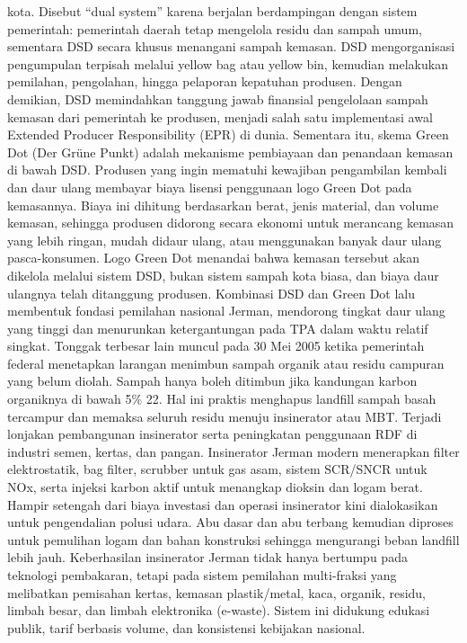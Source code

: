 \documentclass[
  letterpaper,
  DIV=11,
  numbers=noendperiod]{scrreprt}
\begin{document}
kota. Disebut ``dual system'' karena berjalan berdampingan dengan sistem
pemerintah: pemerintah daerah tetap mengelola residu dan sampah umum,
sementara DSD secara khusus menangani sampah kemasan. DSD mengorganisasi
pengumpulan terpisah melalui yellow bag atau yellow bin, kemudian
melakukan pemilahan, pengolahan, hingga pelaporan kepatuhan produsen.
Dengan demikian, DSD memindahkan tanggung jawab finansial pengelolaan
sampah kemasan dari pemerintah ke produsen, menjadi salah satu
implementasi awal Extended Producer Responsibility (EPR) di dunia.
Sementara itu, skema Green Dot (Der Grüne Punkt) adalah mekanisme
pembiayaan dan penandaan kemasan di bawah DSD. Produsen yang ingin
mematuhi kewajiban pengambilan kembali dan daur ulang membayar biaya
lisensi penggunaan logo Green Dot pada kemasannya. Biaya ini dihitung
berdasarkan berat, jenis material, dan volume kemasan, sehingga produsen
didorong secara ekonomi untuk merancang kemasan yang lebih ringan, mudah
didaur ulang, atau menggunakan banyak daur ulang pasca-konsumen. Logo
Green Dot menandai bahwa kemasan tersebut akan dikelola melalui sistem
DSD, bukan sistem sampah kota biasa, dan biaya daur ulangnya telah
ditanggung produsen. Kombinasi DSD dan Green Dot lalu membentuk fondasi
pemilahan nasional Jerman, mendorong tingkat daur ulang yang tinggi dan
menurunkan ketergantungan pada TPA dalam waktu relatif singkat. Tonggak
terbesar lain muncul pada 30 Mei 2005 ketika pemerintah federal
menetapkan larangan menimbun sampah organik atau residu campuran yang
belum diolah. Sampah hanya boleh ditimbun jika kandungan karbon
organiknya di bawah 5\% 22. Hal ini praktis menghapus landfill sampah
basah tercampur dan memaksa seluruh residu menuju insinerator atau MBT.
Terjadi lonjakan pembangunan insinerator serta peningkatan penggunaan
RDF di industri semen, kertas, dan pangan. Insinerator Jerman modern
menerapkan filter elektrostatik, bag filter, scrubber untuk gas asam,
sistem SCR/SNCR untuk NOx, serta injeksi karbon aktif untuk menangkap
dioksin dan logam berat. Hampir setengah dari biaya investasi dan
operasi insinerator kini dialokasikan untuk pengendalian polusi udara.
Abu dasar dan abu terbang kemudian diproses untuk pemulihan logam dan
bahan konstruksi sehingga mengurangi beban landfill lebih jauh.
Keberhasilan insinerator Jerman tidak hanya bertumpu pada teknologi
pembakaran, tetapi pada sistem pemilahan multi-fraksi yang melibatkan
pemisahan kertas, kemasan plastik/metal, kaca, organik, residu, limbah
besar, dan limbah elektronika (e-waste). Sistem ini didukung edukasi
publik, tarif berbasis volume, dan konsistensi kebijakan nasional.
\end{document}

